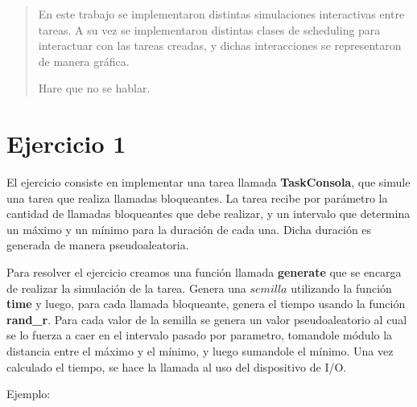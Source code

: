 \documentclass[11pt]{article}
\begin{document}
\subtitulo{}

\fecha{\today}

\grupo{}


\maketitle

\thispagestyle{empty}
\vspace{3cm}
\tableofcontents
\newpage
\vfill

\begin{abstract}
  En este trabajo se implementaron distintas simulaciones interactivas entre tareas. A su vez se implementaron distintas clases de scheduling para interactuar 
  con las tareas creadas, y dichas interacciones se representaron de manera gráfica.

  Hare que no se hablar.
\end{abstract}

\newpage

\section{Ejercicio 1}

El ejercicio consiste en implementar una tarea llamada \textbf{TaskConsola}, que simule una tarea que realiza llamadas bloqueantes. La tarea 
recibe por parámetro la cantidad de llamadas bloqueantes que debe realizar, y un intervalo que determina un máximo y un mínimo para la duración 
de cada una. Dicha duración es generada de manera pseudoaleatoria.

Para resolver el ejercicio creamos una función llamada \textbf{generate} que se encarga de realizar la simulación de la tarea. Genera una $semilla$ utilizando la función 
\textbf{time} y luego, para cada llamada bloqueante, genera el tiempo usando la función \textbf{rand\_r}. Para cada valor de la semilla 
se genera un valor pseudoaleatorio al cual se lo fuerza a caer en el intervalo pasado por parametro, tomandole módulo la distancia entre el máximo y 
el mínimo, y luego sumandole el mínimo. Una vez calculado el tiempo, se hace la llamada al uso del dispositivo de I/O.

Ejemplo: 
\end{document}
